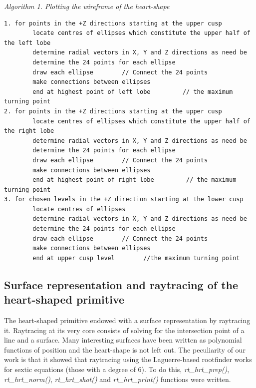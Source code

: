 \hspace{50} \textit{Algorithm 1. Plotting the wireframe of the heart­-shape }
\footnotesize{\begin{verbatim}
1. for points in the +Z directions starting at the upper cusp 
        locate centres of ellipses which constitute the upper half of the left lobe 
        determine radial vectors in X, Y and Z directions as need be 
        determine the 24 points for each ellipse 
        draw each ellipse        // Connect the 24 points 
        make connections between ellipses 
        end at highest point of left lobe         // the maximum turning point 
2. for points in the +Z directions starting at the upper cusp 
        locate centres of ellipses which constitute the upper half of the right lobe 
        determine radial vectors in X, Y and Z directions as need be 
        determine the 24 points for each ellipse 
        draw each ellipse        // Connect the 24 points 
        make connections between ellipses 
        end at highest point of right lobe         // the maximum turning point   
3. for chosen levels in the +Z direction starting at the lower cusp 
        locate centres of ellipses 
        determine radial vectors in X, Y and Z directions as need be 
        determine the 24 points for each ellipse 
        draw each ellipse        // Connect the 24 points 
        make connections between ellipses
        end at upper cusp level        //the maximum turning point 
\end{verbatim}}

\normalsize

\subsection{Surface   representation   and   raytracing   of   the   heart­-shaped primitive}

\hspace{30} The   heart-­shaped   primitive   endowed   with   a   surface   representation   by  
raytracing   it.   Ray­tracing   at   its   very   core   consists   of   solving   for   the   intersection  
point   of   a   line   and   a   surface.   Many   interesting   surfaces   have   been   written   as  
polynomial   functions   of   position   and   the   heart­-shape   is   not   left   out.   The  
peculiarity   of   our   work   is   that   it  showed   that   ray­tracing   using   the  
Laguerre­-based   root­finder   works   for   sextic   equations   (those   with   a   degree   of  
6). To   do   this,  \textit{rt\_hrt\_prep()},   \textit{rt\_hrt\_norm()},   \textit{rt\_hrt\_shot()}   and  
\textit{rt\_hrt\_print()} functions were written.

